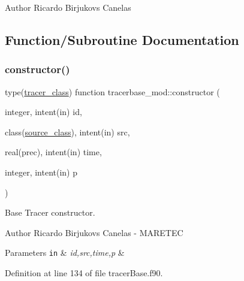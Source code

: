 \begin{DoxyAuthor}{Author}
Ricardo Birjukovs Canelas 
\end{DoxyAuthor}


\subsection{Function/\+Subroutine Documentation}
\mbox{\label{namespacetracerbase__mod_aefc12c2007d7598ff9b35733b430a3a2}} 
\subsubsection{\texorpdfstring{constructor()}{constructor()}}
{\footnotesize\ttfamily type(\mbox{\hyperlink{structtracerbase__mod_1_1tracer__class}{tracer\+\_\+class}}) function tracerbase\+\_\+mod\+::constructor (\begin{DoxyParamCaption}\item[{integer, intent(in)}]{id,  }\item[{class(\mbox{\hyperlink{structsources__mod_1_1source__class}{source\+\_\+class}}), intent(in)}]{src,  }\item[{real(prec), intent(in)}]{time,  }\item[{integer, intent(in)}]{p }\end{DoxyParamCaption})\hspace{0.3cm}{\ttfamily [private]}}



Base Tracer constructor. 

\begin{DoxyAuthor}{Author}
Ricardo Birjukovs Canelas -\/ M\+A\+R\+E\+T\+EC 
\end{DoxyAuthor}

\begin{DoxyParams}[1]{Parameters}
\mbox{\tt in}  & {\em id,src,time,p} & \\
\hline
\end{DoxyParams}


Definition at line 134 of file tracer\+Base.\+f90.


